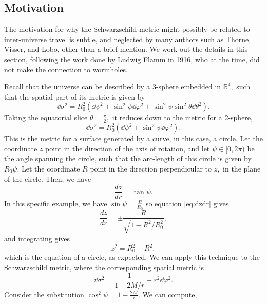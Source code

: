 \documentclass[%
 reprint,
 amsmath,amssymb
 aps,
]{revtex4}
\theoremstyle{remark}
\begin{document}
\subsection{Motivation}
The motivation for why the Schwarzschild metric might possibly be related to inter-universe travel is subtle, and neglected by many authors such as Thorne, Visser, and Lobo, other than a brief mention\cite{Thorne}\cite{Visser}\cite{Lobo}. We work out the details in this section, following the work done by Ludwig Flamm in 1916, who at the time, did not make the connection to wormholes\cite{Gibbons}.

Recall that the universe can be described by a 3-sphere embedded in $\mathbb{R}^4,$ such that the spatial part of its metric is given by 
\begin{equation}
    \dd{\sigma}^2 = R_0^2\left(\dd{\psi}^2 + \sin^2\psi\dd{\varphi}^2+\sin^2\psi\sin^2\theta\dd{\theta}^2\right).
\end{equation} 
Taking the equatorial slice $\theta=\frac{\pi}{2},$ it reduces down to the metric for a 2-sphere,
\begin{equation}
    \dd{\sigma}^2 = R_0^2\left(\dd{\psi}^2 + \sin^2\psi\dd{\varphi}^2\right).
\end{equation}
This is the metric for a surface generated by a curve, in this case, a circle. Let the coordinate $z$ point in the direction of the axis of rotation, and let $\psi \in [0,2\pi)$ be the angle spanning the circle, such that the arc-length of this circle is given by $R_0\psi.$ Let the coordinate $R$ point in the direction perpendicular to $z,$ in the plane of the circle. Then, we have 
\begin{equation}
    \frac{dz}{dr} = \tan\psi. \label{eq:dzdr}
\end{equation}
In this specific example, we have $\sin\psi = \frac{R}{R_0}$ so equation \ref{eq:dzdr} gives 
\begin{equation}
    \frac{dz}{dr} = \pm \frac{R}{\sqrt{1-R^2/R_0^2}},
\end{equation}
and integrating gives 
\begin{equation}
    z^2 = R_0^2 - R^2,
\end{equation}
which is the equation of a circle, as expected. We can apply this technique to the Schwarzschild metric, where the corresponding spatial metric is 
\begin{equation}
    \dd{\sigma}^2 = \frac{1}{1-2M/r}+r^2\dd{\varphi}^2.
\end{equation}
Consider the substitution $\cos^2\psi = 1 - \frac{2M}{r}.$ We can compute,
\end{document}
